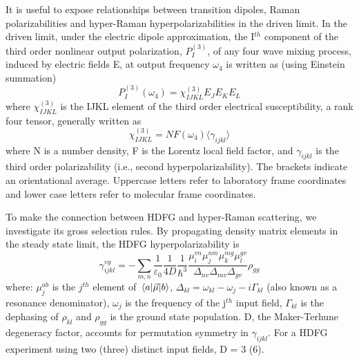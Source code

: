 \documentclass[aip, jcp, reprint, onecolumn]{revtex4-2}
\begin{document}
It is useful to expose relationships between transition dipoles, Raman polarizabilities and hyper-Raman hyperpolarizabilities in the driven limit. \cite{Druet1978, Simpson2004}
In the driven limit, under the electric dipole approximation, the I$^{th}$ component of the third order nonlinear output polarization, ${P}^{(3)}_I$, of any four wave mixing process, induced by electric fields E, at output frequency $\omega_4$ is written as (using Einstein summation) \cite{RN307}
\begin{equation} \label{polarization}
{P}^{(3)}_I (\omega_4)  = \chi^{(3)}_{IJKL} E_J E_K E_L 
\end{equation}
where $\chi^{(3)}_{IJKL}$ is the IJKL element of the third order electrical susceptibility, a rank four tensor, generally written as
\begin{equation}
	\chi^{(3)}_{IJKL} = NF(\omega_4) \langle \gamma_{ijkl} \rangle
\end{equation}
where N is a number density, F is the Lorentz local field factor, and $\gamma_{ijkl}$ is the third order polarizability (i.e., second hyperpolarizability). 
The brackets indicate an orientational average. 
Uppercase letters refer to laboratory frame coordinates and lower case letters refer to molecular frame coordinates.

To make the connection between HDFG and hyper-Raman scattering, we investigate its gross selection rules.
By propagating density matrix elements in the steady state limit, the HDFG hyperpolarizability is \cite{RN133}
\begin{equation}\label{sivegamma}
		\gamma_{ijkl}^{vg} =	- \sum_{m, n} \frac{1}{\varepsilon_0} \frac{1}{4D} \frac{1}{\hbar^3} \frac{\mu^{vn}_{i} \mu^{nm}_{j} \mu^{mg}_{k} \mu^{gv}_{l} }{\Delta_{nv} \Delta_{mv}\Delta_{gv}}  \rho_{gg}
\end{equation}
where: $\mu^{ab}_{j}$ is the $j^{th}$ element of $\mel{a}{\vec{\mu}}{b}$, $\Delta_{kl} = \omega_{kl} - \omega_{j} - i\Gamma_{kl}$ (also known as a resonance denominator), $\omega_j$ is the frequency of the j$^{th}$ input field, $\Gamma_{kl}$ is the dephasing of $\rho_{kl}$ and $\rho_{gg}$ is the ground state population.
D, the Maker-Terhune degeneracy factor, accounts for permutation symmetry in $\gamma_{ijkl}$.\cite{RN134} 
For a HDFG experiment using two (three) distinct input fields, D = 3 (6).
\end{document}
